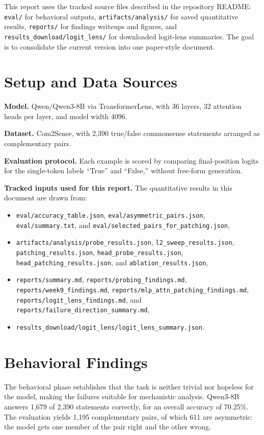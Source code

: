 \documentclass{article}
\begin{document}
This report uses the tracked source files described in the repository README: \texttt{eval/} for behavioral outputs, \texttt{artifacts/analysis/} for saved quantitative results, \texttt{reports/} for findings writeups and figures, and \texttt{results\_download/logit\_lens/} for downloaded logit-lens summaries. The goal is to consolidate the current version into one paper-style document.

\section{Setup and Data Sources}

\textbf{Model.} Qwen/Qwen3-8B via TransformerLens, with 36 layers, 32 attention heads per layer, and model width 4096.

\textbf{Dataset.} Com2Sense, with 2,390 true/false commonsense statements arranged as complementary pairs.

\textbf{Evaluation protocol.} Each example is scored by comparing final-position logits for the single-token labels ``True'' and ``False,'' without free-form generation.

\textbf{Tracked inputs used for this report.} The quantitative results in this document are drawn from:
\begin{itemize}
\item \texttt{eval/accuracy\_table.json}, \texttt{eval/asymmetric\_pairs.json}, \texttt{eval/summary.txt}, and \texttt{eval/selected\_pairs\_for\_patching.json},
\item \texttt{artifacts/analysis/probe\_results.json}, \texttt{l2\_sweep\_results.json}, \texttt{patching\_results.json}, \texttt{head\_probe\_results.json}, \texttt{head\_patching\_results.json}, and \texttt{ablation\_results.json},
\item \texttt{reports/summary.md}, \texttt{reports/probing\_findings.md}, \texttt{reports/week9\_findings.md}, \texttt{reports/mlp\_attn\_patching\_findings.md}, \texttt{reports/logit\_lens\_findings.md}, and \texttt{reports/failure\_direction\_summary.md},
\item \texttt{results\_download/logit\_lens/logit\_lens\_summary.json}.
\end{itemize}

\section{Behavioral Findings}

The behavioral phase establishes that the task is neither trivial nor hopeless for the model, making the failures suitable for mechanistic analysis. Qwen3-8B answers 1,679 of 2,390 statements correctly, for an overall accuracy of 70.25\%. The evaluation yields 1,195 complementary pairs, of which 611 are asymmetric: the model gets one member of the pair right and the other wrong.
\end{document}
